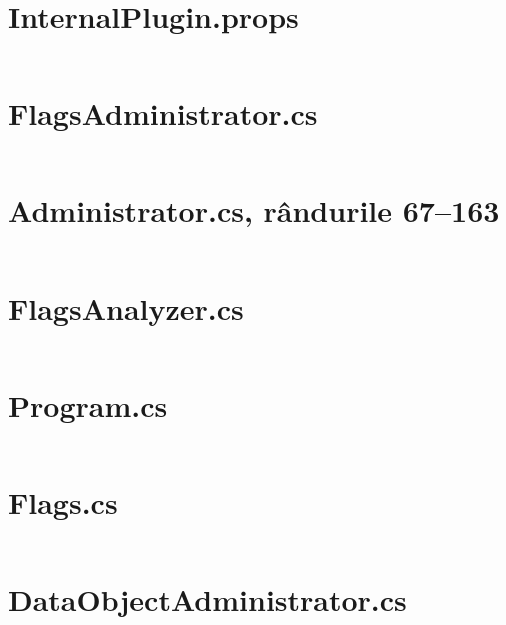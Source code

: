 \documentclass[a4paper,12pt]{report}
\begin{document}
\clearpage\section{InternalPlugin.props}\label{appendix:Kari____Kari_source_Kari_Plugins_InternalPlugin}
\inputminted{xml}{../Kari/source/Kari.Plugins/InternalPlugin.props}

\clearpage\section{FlagsAdministrator.cs}\label{appendix:Kari____Kari_source_Kari_Plugins_Flags_FlagsAdministrator}
\inputminted{cs}{../Kari/source/Kari.Plugins/Flags/FlagsAdministrator.cs}

\clearpage\section{Administrator.cs, rândurile 67--163}\label{appendix:Kari____Kari_source_Kari_GeneratorCore_Workflow_Administrator_67_163}
\inputminted[firstline=67, lastline=163]{cs}{../Kari/source/Kari.GeneratorCore/Workflow/Administrator.cs}

\clearpage\section{FlagsAnalyzer.cs}\label{appendix:Kari____Kari_source_Kari_Plugins_Flags_FlagsAnalyzer}
\inputminted{cs}{../Kari/source/Kari.Plugins/Flags/FlagsAnalyzer.cs}

\clearpage\section{Program.cs}\label{appendix:uni_thesis____examples_flags_Program}
\inputminted{cs}{../examples/flags/Program.cs}

\clearpage\section{Flags.cs}\label{appendix:uni_thesis____examples_flags_Generated_Flags}
\inputminted{cs}{../examples/flags/Generated/Flags.cs}

\clearpage\section{DataObjectAdministrator.cs}\label{appendix:Kari____Kari_source_Kari_Plugins_DataObject_DataObjectAdministrator}
\inputminted{cs}{../Kari/source/Kari.Plugins/DataObject/DataObjectAdministrator.cs}
\end{document}
